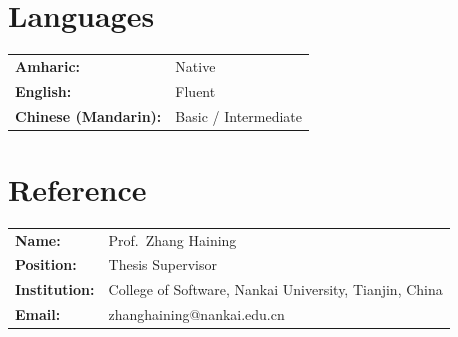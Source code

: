 \section*{Languages}

\begin{tabular}{@{} l l}
\textbf{Amharic:}             & Native \\
\textbf{English:}             & Fluent \\
\textbf{Chinese (Mandarin):}  & Basic / Intermediate \\
\end{tabular}

\section*{Reference}

\begin{tabular}{@{} p{4cm} p{10cm}}
\textbf{Name:}         & Prof.\ Zhang Haining \\
\textbf{Position:}     & Thesis Supervisor \\
\textbf{Institution:}  & College of Software, Nankai University, Tianjin, China \\
\textbf{Email:}        & zhanghaining@nankai.edu.cn \\
\end{tabular}
